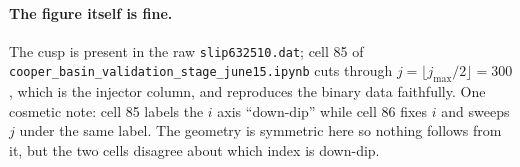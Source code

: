\documentclass[11pt]{article}
\newcommand{\code}[1]{\texttt{#1}}
\begin{document}
\paragraph{The figure itself is fine.} The cusp is present in the raw
\code{slip632510.dat}; cell 85 of
\code{cooper\_basin\_\allowbreak validation\_\allowbreak stage\_\allowbreak june15.ipynb} cuts through
$j=\lfloor j_{\max}/2\rfloor = 300$, which is the injector column, and
reproduces the binary data faithfully. One cosmetic note: cell 85 labels the
$i$ axis ``down-dip'' while cell 86 fixes $i$ and sweeps $j$ under the same
label. The geometry is symmetric here so nothing follows from it, but the two
cells disagree about which index is down-dip.
\end{document}

